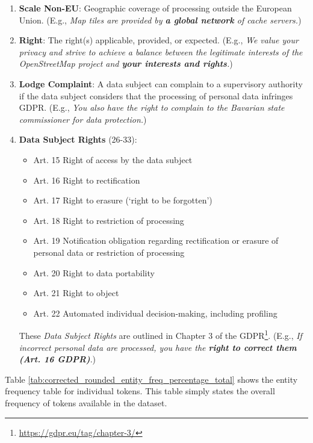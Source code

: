 \documentclass[a4paper,
               biblatex,     %
               hyphens,      %
               ]{jacow}
\begin{document}
\begin{enumerate}
    \item \textbf{Scale Non-EU}: Geographic coverage of processing outside the European Union. (E.g., \textit{Map tiles are provided by \textbf{a global network} of cache servers.})
    
    \item \textbf{Right}: The right(s) applicable, provided, or expected. (E.g., \textit{We value your privacy and strive to achieve a balance between the legitimate interests of the OpenStreetMap project and \textbf{your interests and rights}.})

    \item \textbf{Lodge Complaint}: A data subject can complain to a supervisory authority if the data subject considers that the processing of personal data infringes GDPR. (E.g., \textit{You also have the right to complain to the Bavarian state commissioner for data protection.})

    \item \textbf{Data Subject Rights} (26-33):
    \begin{itemize}
        \item Art. 15 Right of access by the data subject
        \item Art. 16 Right to rectification
        \item Art. 17 Right to erasure (‘right to be forgotten’)
        \item Art. 18 Right to restriction of processing
        \item Art. 19 Notification obligation regarding rectification or erasure of personal data or restriction of processing
        \item Art. 20 Right to data portability
        \item Art. 21 Right to object
        \item Art. 22 Automated individual decision-making, including profiling
    \end{itemize}
    These \textit{Data Subject Rights} are outlined in Chapter 3 of the GDPR\footnote{\url{https://gdpr.eu/tag/chapter-3/}}.
    (E.g., \textit{If incorrect personal data are processed, you have the \textbf{right to correct them (Art. 16 GDPR)}}.)
\end{enumerate}

Table \ref{tab:corrected_rounded_entity_freq_percentage_total} shows the entity frequency table for individual tokens. This table simply states the overall frequency of tokens available in the dataset.
\end{document}
